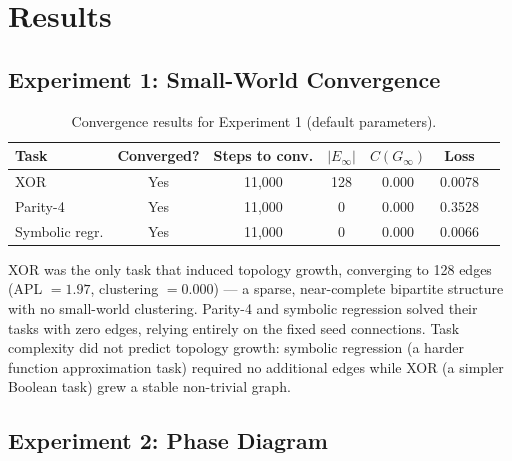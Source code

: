\documentclass[12pt]{article}
\begin{document}
\section{Results}
\label{sec:results}

\subsection{Experiment 1: Small-World Convergence}

\begin{table}[H]
\centering
\small
\begin{tabular}{lcccccc}
\toprule
\textbf{Task} & \textbf{Converged?} & \textbf{Steps to conv.} & $|E_{\infty}|$ & $C(G_\infty)$ & \textbf{Loss} \\
\midrule
XOR              & Yes & 11{,}000 & 128 & 0.000 & 0.0078 \\
Parity-4         & Yes & 11{,}000 & 0   & 0.000 & 0.3528 \\
Symbolic regr.   & Yes & 11{,}000 & 0   & 0.000 & 0.0066 \\
\bottomrule
\end{tabular}
\caption{Convergence results for Experiment 1 (default parameters).}
\end{table}

XOR was the only task that induced topology growth, converging to 128 edges (APL $= 1.97$, clustering $= 0.000$) --- a sparse, near-complete bipartite structure with no small-world clustering. Parity-4 and symbolic regression solved their tasks with zero edges, relying entirely on the fixed seed connections. Task complexity did not predict topology growth: symbolic regression (a harder function approximation task) required no additional edges while XOR (a simpler Boolean task) grew a stable non-trivial graph.

\subsection{Experiment 2: Phase Diagram}
\end{document}
